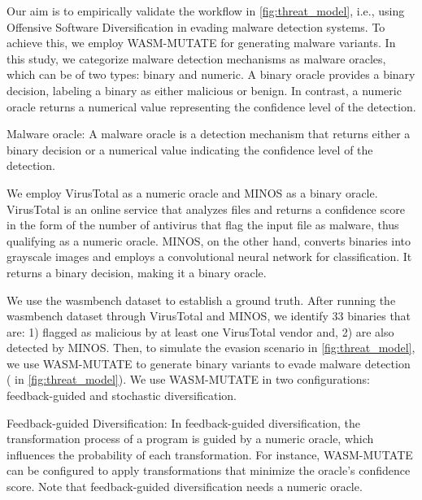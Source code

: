 
Our aim is to empirically validate the workflow in \autoref{fig:threat_model}, i.e., using Offensive Software Diversification in evading malware detection systems.
To achieve this, we employ WASM-MUTATE for generating \Wasm malware variants.
In this study, we categorize malware detection mechanisms as malware oracles, which can be of two types: binary and numeric. 
A binary oracle provides a binary decision, labeling a \Wasm binary as either malicious or benign. 
In contrast, a numeric oracle returns a numerical value representing the confidence level of the detection.

\begin{definition}{Malware oracle:}
    \label{malware_oracle_def}
    A malware oracle is a detection mechanism that returns either a binary decision or a numerical value indicating the confidence level of the detection.
\end{definition}


We employ VirusTotal as a numeric oracle and MINOS \cite{MINOS} as a binary oracle. 
VirusTotal is an online service that analyzes files and returns a confidence score in the form of the number of antivirus that flag the input file as malware, thus qualifying as a numeric oracle. 
MINOS, on the other hand, converts \Wasm binaries into grayscale images and employs a convolutional neural network for classification. 
It returns a binary decision, making it a binary oracle.


We use the wasmbench dataset \cite{Hilbig2021AnES} to establish a ground truth. 
After running the wasmbench dataset through VirusTotal and MINOS, we identify 33 binaries that are: 1) flagged as malicious by at least one VirusTotal vendor and, 2) are also detected by MINOS.
Then, to simulate the evasion scenario in \autoref{fig:threat_model}, we use WASM-MUTATE to generate \Wasm binary variants to evade malware detection ( in \autoref{fig:threat_model}).
We use WASM-MUTATE in two configurations: feedback-guided and stochastic diversification.

\begin{definition}{Feedback-guided Diversification:}
    \label{controlled_def}
    In feedback-guided diversification, the transformation process of a \Wasm program is guided by a numeric oracle, which influences the probability of each transformation. For instance, WASM-MUTATE can be configured to apply transformations that minimize the oracle's confidence score. Note that feedback-guided diversification needs a numeric oracle.
\end{definition}


